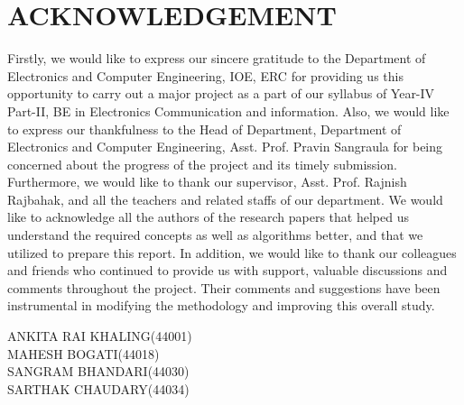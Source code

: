\chapter*{ACKNOWLEDGEMENT}


Firstly, we would like to express our sincere gratitude to the Department of Electronics and Computer Engineering, IOE, ERC for providing us this opportunity to carry out a major project as a part of our syllabus of Year-IV Part-II, BE in Electronics Communication and information. Also, we would like to express our thankfulness to the Head of Department, Department of Electronics and Computer Engineering, Asst. Prof. Pravin Sangraula for being concerned about the progress of the project and its timely submission. Furthermore, we would like to thank our supervisor, Asst. Prof. Rajnish Rajbahak, and  all the teachers and related staffs of our department.
We would like to acknowledge all the authors of the research papers that helped us understand the required concepts as well as algorithms better, and that we utilized to prepare this report.
In addition, we would like to thank our colleagues and friends who continued to provide us with support, valuable discussions and comments throughout the project. Their comments and suggestions have been instrumental in modifying the methodology and improving this overall study. \\
\vspace{1cm}

ANKITA RAI KHALING(44001)\\
MAHESH BOGATI(44018)\\
SANGRAM BHANDARI(44030)\\
SARTHAK CHAUDARY(44034)\\
